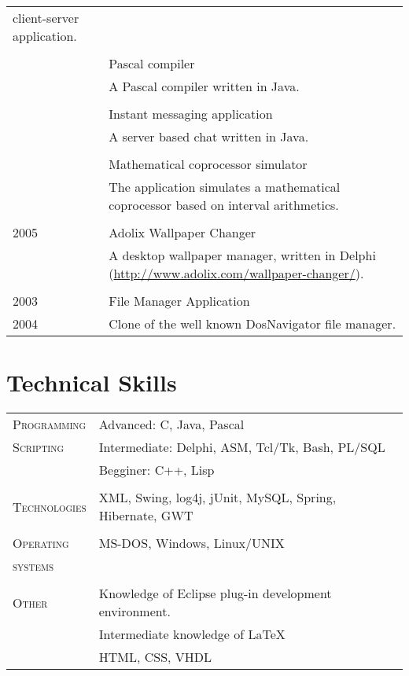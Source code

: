 \documentclass[a4paper,10pt]{article}
\begin{document}
\begin{longtable}{p{2.5cm}|p{11cm}}
{ client-server application.} \\ 
 \multicolumn{2}{c}{} \\
 & Pascal compiler \\ & \footnotesize{A Pascal compiler written in Java.} \\
 \multicolumn{2}{c}{} \\
 & Instant messaging application \\ & \footnotesize{A server based chat written
 in Java.} \\
 \multicolumn{2}{c}{} \\
 & Mathematical coprocessor simulator \\ & \footnotesize{The application
 simulates a mathematical coprocessor based on interval arithmetics.} \\
 \multicolumn{2}{c}{} \\
 \raggedleft \textsc{2005} & Adolix Wallpaper Changer \\ & \footnotesize{A
 desktop wallpaper manager, written in Delphi
 (\href{http://www.adolix.com/wallpaper-changer/}{http://www.adolix.com/wallpaper-changer/}).} \\
 \multicolumn{2}{c}{} \\
  \raggedleft \textsc{2003} & File Manager Application \\
  \raggedleft \textsc{2004} & \footnotesize{Clone of the well known
DosNavigator file manager.} \\
\end{longtable}

\section{Technical Skills}
\begin{tabular}{p{2.5cm}p{11cm}}
\textsc{Programming} & Advanced: C, Java, Pascal \\
\textsc{Scripting} & Intermediate: Delphi, ASM, Tcl/Tk, Bash, PL/SQL \\
& Begginer: C++, Lisp \\
 \multicolumn{2}{c}{} \\ 
 \textsc{Technologies} & XML, Swing, log4j, jUnit, MySQL, Spring, Hibernate, GWT
 \\ \multicolumn{2}{c}{} \\
 \textsc{Operating} & MS-DOS, Windows, Linux/UNIX\\
 \textsc{systems}&\\ 
 \multicolumn{2}{c}{} \\
 \textsc{Other} & Knowledge of Eclipse plug-in development environment. \\
 & Intermediate knowledge of \LaTeX \\
 & HTML, CSS, VHDL\\
\end{tabular}
\end{document}
